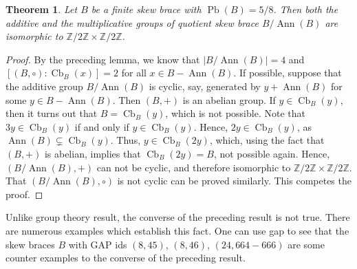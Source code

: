 \documentclass[oneside]{amsart}
\numberwithin{equation}{section}
\theoremstyle{plain}
\newtheorem{thm}[equation]{Theorem}
\theoremstyle{definition}
\newcommand{\Cb}{\operatorname{Cb} }
\newcommand{\Pb}{\operatorname{Pb} }
\newcommand{\Ann}{\operatorname{Ann} }
\begin{document}
\begin{thm}
   Let $B$ be a finite skew brace with $\Pb(B)=5/8$. Then both the additive and the multiplicative groups of quotient skew brace $B/\Ann(B)$ are isomorphic to $\mathbb{Z}/2\mathbb{Z} \times \mathbb{Z}/2\mathbb{Z}$.
\end{thm}
\begin{proof}
    By the preceding lemma, we know that $|B/\Ann(B)|=4$ and $[(B,\circ) : \Cb_B(x)] = 2$ for all $x \in B-\Ann(B)$. If possible, suppose that the additive group $B/\Ann(B)$ is cyclic, say, generated by $y +\Ann(B)$ for some $y \in B - \Ann(B)$. Then $(B, +)$ is an abelian group. If $y \in \Cb_B(y)$, then it turns out that $B = \Cb_B(y)$, which is not possible. Note that $3y \in \Cb_B(y)$ if and only if $y \in \Cb_B(y)$. Hence, $2y \in \Cb_B(y)$, as $\Ann(B) \subsetneq \Cb_B(y)$. Thus, $y \in \Cb_B(2y)$, which, using the fact that $(B, +)$ is abelian,  implies that $ \Cb_B(2y) = B$, not possible again. Hence, $(B/\Ann(B), +)$ can not be cyclic, and therefore isomorphic to $\mathbb{Z}/2\mathbb{Z} \times \mathbb{Z}/2\mathbb{Z}$. That $(B/\Ann(B), \circ)$ is not cyclic can be proved similarly. This competes the proof. 
 \end{proof}
 
 Unlike  group theory result, the  converse of the preceding result is  not true. There are numerous examples which establish this fact. One can use gap to see that the skew braces $B$ with GAP ids $(8, 45)$, $(8, 46)$, $(24, 664-666)$ are some counter examples to the converse of the preceding result.
\end{document}

